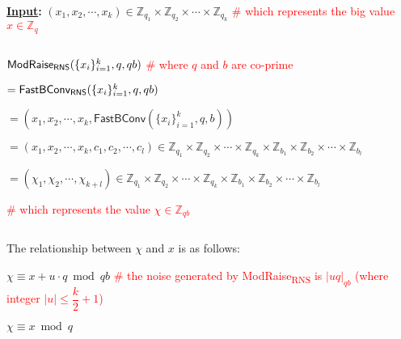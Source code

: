  \begin{tcolorbox}[title={\textbf{\tboxlabel{\ref*{subsec:rns-modraise}} \textsf{ModRaise\textsubscript{RNS}}}}]

\textbf{\underline{Input}:} $(x_1, x_2, \cdots, x_k) \in \mathbb{Z}_{q_1} \times \mathbb{Z}_{q_2} \times \cdots \times \mathbb{Z}_{q_k}$ \textcolor{red}{ \# which represents the big value $x \in \mathbb{Z}_q$}

$ $


$\textsf{ModRaise\textsubscript{RNS}}(\{x_i\}_{i=1}^k, q, qb)$ \textcolor{red}{ \# where $q$ and $b$ are co-prime}

$= \textsf{FastBConv\textsubscript{RNS}}(\{x_i\}_{i=1}^k, q, qb)$ 

$ = (x_1, x_2, \cdots, x_k, \textsf{FastBConv}(\{x_i\}_{i=1}^k, q, b))$ 

$ = (x_1, x_2, \cdots, x_k, c_1, c_2, \cdots, c_l) \in \mathbb{Z}_{q_1} \times \mathbb{Z}_{q_2} \times \cdots \times \mathbb{Z}_{q_k} \times \mathbb{Z}_{b_1} \times \mathbb{Z}_{b_2} \times \cdots \times \mathbb{Z}_{b_l}$

$ = (\chi_1, \chi_2, \cdots, \chi_{k+l}) \in \mathbb{Z}_{q_1} \times \mathbb{Z}_{q_2} \times \cdots \times \mathbb{Z}_{q_k} \times \mathbb{Z}_{b_1} \times \mathbb{Z}_{b_2} \times \cdots \times \mathbb{Z}_{b_l}$

\textcolor{red}{ \# which represents the value $\chi \in \mathbb{Z}_{qb}$}

$ $


The relationship between $\chi$ and $x$ is as follows: 

$\chi \equiv x + u\cdot q \bmod qb$ \textcolor{red}{ \# the noise generated by \textsf{ModRaise\textsubscript{RNS}} is $|uq|_{qb}$ (where integer $|u| \leq \dfrac{k}{2}+1$)}

$\chi \equiv x \bmod q$

\end{tcolorbox}



